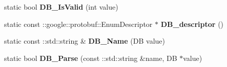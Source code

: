 \begin{DoxyCompactItemize}
\item 
\mbox{\label{classcaffe_1_1_data_parameter_a13ddf96e6817764d8f2f19f015e70298}} 
static bool {\bfseries D\+B\+\_\+\+Is\+Valid} (int value)
\item 
\mbox{\label{classcaffe_1_1_data_parameter_aeadf67426e0ac1d595cab85521014474}} 
static const \+::google\+::protobuf\+::\+Enum\+Descriptor $\ast$ {\bfseries D\+B\+\_\+descriptor} ()
\item 
\mbox{\label{classcaffe_1_1_data_parameter_a98b72d95d27b36490ea4c724287e97fe}} 
static const \+::std\+::string \& {\bfseries D\+B\+\_\+\+Name} (DB value)
\item 
\mbox{\label{classcaffe_1_1_data_parameter_aedc48e3721c1f9eabcc94bfa7f59d136}} 
static bool {\bfseries D\+B\+\_\+\+Parse} (const \+::std\+::string \&name, DB $\ast$value)
\end{DoxyCompactItemize}
